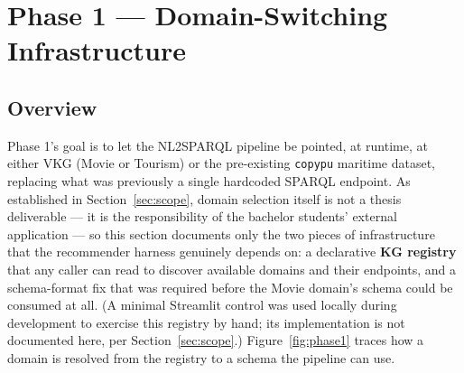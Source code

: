 \documentclass[11pt,a4paper]{article}
\newcommand{\code}[1]{\texttt{#1}}
\begin{document}
\newpage
\section{Phase 1 --- Domain-Switching Infrastructure}

\subsection{Overview}

Phase 1's goal is to let the NL2SPARQL pipeline be pointed, at runtime, at either VKG (Movie or
Tourism) or the pre-existing \code{copypu} maritime dataset, replacing what was previously a
single hardcoded SPARQL endpoint. As established in Section~\ref{sec:scope}, domain selection
itself is not a thesis deliverable --- it is the responsibility of the bachelor students'
external application --- so this section documents only the two pieces of infrastructure that
the recommender harness genuinely depends on: a declarative \textbf{KG registry} that any caller
can read to discover available domains and their endpoints, and a schema-format fix that was
required before the Movie domain's schema could be consumed at all. (A minimal Streamlit control
was used locally during development to exercise this registry by hand; its implementation is not
documented here, per Section~\ref{sec:scope}.) Figure~\ref{fig:phase1} traces how a domain is
resolved from the registry to a schema the pipeline can use.
\end{document}

